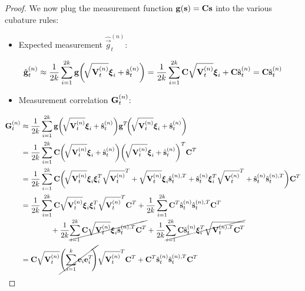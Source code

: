 \begin{proof}
			We now plug the measurement function \( \boldsymbol{\mathrm{g}}(\boldsymbol{\mathrm{s}}) = \boldsymbol{\mathrm{C}} \boldsymbol{\mathrm{s}} \) into the various cubature rules:
			\begin{itemize}
				\item Expected measurement \( \hat{\vec{g}}_t^{(n)} \):
			\end{itemize}
			\begin{align*}
				\hat{\boldsymbol{\mathrm{g}}}_t^{(n)}
					\approx \frac{1}{2k} \sum_{i = 1}^{2k} \boldsymbol{\mathrm{g}}\bigg(\!\sqrt{\boldsymbol{\mathrm{V}}_t^{(n)}} \boldsymbol{\mathrm{\xi}}_i + \hat{\boldsymbol{\mathrm{s}}}_t^{(n)}\bigg)
					= \frac{1}{2k} \sum_{i = 1}^{2k} \boldsymbol{\mathrm{C}} \sqrt{\boldsymbol{\mathrm{V}}_t^{(n)}} \boldsymbol{\mathrm{\xi}}_i + \boldsymbol{\mathrm{C}} \hat{\boldsymbol{\mathrm{s}}}_t^{(n)}
					= \boldsymbol{\mathrm{C}} \hat{\boldsymbol{\mathrm{s}}}_t^{(n)}
			\end{align*}
			\begin{itemize}
				\item Measurement correlation \( \boldsymbol{\mathrm{G}}_t^{(n)} \):
			\end{itemize}
			\begin{align*}
				\mat{G}_t^{(n)}
					&\approx \frac{1}{2k} \sum_{i = 1}^{2k} \vec{g}\bigg(\! \sqrt{\mat{V}_t^{(n)}} \vec{\xi}_i + \hat{\vec{s}}_t^{(n)}\bigg) \vec{g}^T\!\bigg(\! \sqrt{\mat{V}_t^{(n)}} \vec{\xi}_i + \hat{\vec{s}}_t^{(n)} \bigg) \\
					&= \frac{1}{2k} \sum_{i = 1}^{2k} \mat{C} \bigg(\! \sqrt{\mat{V}_t^{(n)}} \vec{\xi}_i + \hat{\vec{s}}_t^{(n)}\bigg) \bigg(\! \sqrt{\mat{V}_t^{(n)}} \vec{\xi}_i + \hat{\vec{s}}_t^{(n)}\bigg)^T \mat{C}^T \\
					&= \frac{1}{2k} \sum_{i = 1}^{2k} \mat{C} \bigg(\! \sqrt{\mat{V}_t^{(n)}} \vec{\xi}_i \vec{\xi}_i^T \sqrt{\mat{V}_t^{(n)}}^T + \sqrt{\mat{V}_t^{(n)}} \vec{\xi}_i \hat{\vec{s}}_t^{(n), T} + \hat{\vec{s}}_t^{(n)} \vec{\xi}_i^T \sqrt{\mat{V}_t^{(n)}}^T + \hat{\vec{s}}_t^{(n)} \hat{\vec{s}}_t^{(n), T} \bigg) \mat{C}^T \\
					&= \frac{1}{2k} \sum_{i = 1}^{2k} \mat{C} \sqrt{\mat{V}_t^{(n)}} \vec{\xi}_i \vec{\xi}_i^T \sqrt{\mat{V}_t^{(n)}}^T \mat{C}^T + \frac{1}{2k} \sum_{i = 1}^{2k} \mat{C}^T \hat{\vec{s}}_t^{(n)} \hat{\vec{s}}_t^{(n), T} \mat{C}^T \\
						&\qquad\qquad + \frac{1}{2k} \cancel{\sum_{i = 1}^{2k} \mat{C} \sqrt{\mat{V}_t^{(n)}} \vec{\xi}_i \hat{\vec{s}}_t^{(n), T} \mat{C}^T} + \frac{1}{2k} \cancel{\sum_{i = 1}^{2k} \mat{C} \hat{\vec{s}}_t^{(n)} \vec{\xi}_i^T \sqrt{\mat{V}_t^{(n), T} \mat{C}^T}} \\
					&= \mat{C} \sqrt{\mat{V}_t^{(n)}} \cancel{\Bigg(\! \sum_{i = 1}^{k} \vec{e}_i \vec{e}_i^T \!\Bigg)} \sqrt{\mat{V}_t^{(n)}}^T \mat{C}^T + \mat{C}^T \hat{\vec{s}}_t^{(n)} \hat{\vec{s}}_t^{(n), T} \mat{C}^T \\

\end{align*}
\end{proof}
